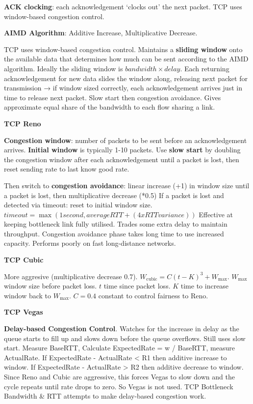 \documentclass{article}
\begin{document}
\textbf{ACK clocking}: each acknowledgement `clocks out' the next packet. TCP uses window-based congestion control.

\textbf{AIMD Algorithm}: Additive Increase, Multiplicative Decrease.

TCP uses window-based congestion control.
Maintains a \textbf{sliding window} onto the available data that determines how much can be sent according to the AIMD algorithm.
Ideally the sliding window is $bandwidth \times delay$.
Each returning acknowledgement for new data slides the window along, releasing next packet for transmission → if window sized
correctly, each acknowledgement arrives just in time to release next packet.
Slow start then congestion avoidance.
Gives approximate equal share of the bandwidth to each flow sharing a link.

\vspace{\baselineskip}
\textbf{TCP Reno}

\textbf{Congestion window}: number of packets to be sent before an acknowledgement arrives.
\textbf{Initial window} is typically 1{-}10 packets.
Use \textbf{slow start} by doubling the congestion window after each acknowledgement until a packet is lost,
then reset sending rate to last know good rate.

Then switch to \textbf{congestion avoidance}: linear increase (+1) in window size until a packet is lost, then multiplicative decrease (*0.5)
If a packet is lost and detected via timeout: reset to initial window size.
$timeout = \max(1 second, average RTT + (4 x RTT variance))$
Effective at keeping bottleneck link fully utilised.
Trades some extra delay to maintain throughput.
Congestion avoidance phase takes long time to use increased capacity.
Performs poorly on fast long-distance networks.

\vspace{\baselineskip}
\textbf{TCP Cubic}

More aggresive (multiplicative decrease 0.7).
$W_{\text{cubic}} = C {(t - K)}^3 + W_{\text{max}}$.
$W_{\text{max}}$ window size before packet loss.
$t$ time since packet loss.
$K$ time to increase window back to $W_{\text{max}}$.
$C = 0.4$ constant to control fairness to Reno.

\vspace{\baselineskip}
\textbf{TCP Vegas}

\textbf{Delay-based Congestion Control}.
Watches for the increase in delay as the queue starts to fill up and slows down before the queue overflows.
Still uses slow start.
Measure BaseRTT, Calculate ExpectedRate = w / BaseRTT, measure ActualRate.
If ExpectedRate {-} ActualRate < R1 then additive increase to window.
If ExpectedRate {-} ActualRate > R2 then additive decrease to window.
Since Reno and Cubic are aggressive, this forces Vegas to slow down and the cycle repeats until rate drops to zero.
So Vegas is not used. TCP Bottleneck Bandwidth \& RTT attempts to make delay-based congestion work.
\end{document}
